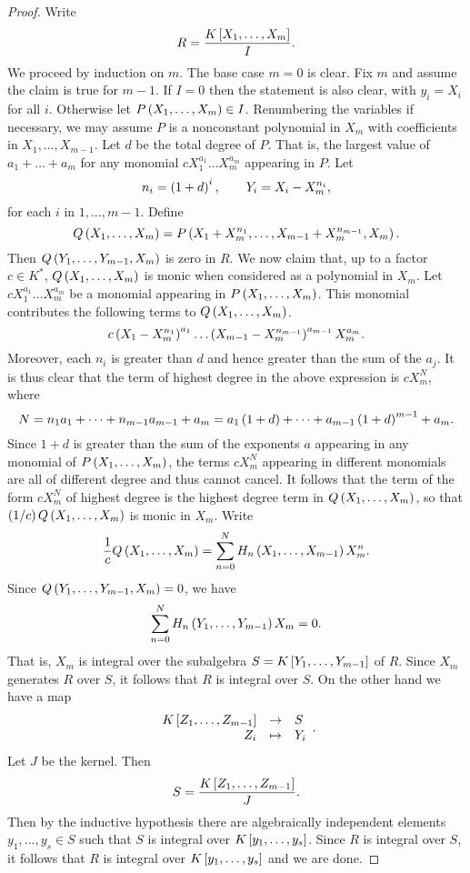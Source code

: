\begin{proof}
Write
$$ R = \dfrac{K\sb{X_1, \dots, X_m}}{I}. $$
We proceed by induction on $ m $. The base case $ m = 0 $ is clear. Fix $ m $ and assume the claim is true for $ m - 1 $. If $ I = 0 $ then the statement is also clear, with $ y_i = X_i $ for all $ i $. Otherwise let $ P\rb{X_1, \dots, X_m} \in I $. Renumbering the variables if necessary, we may assume $ P $ is a nonconstant polynomial in $ X_m $ with coefficients in $ X_1, \dots, X_{m - 1} $. Let $ d $ be the total degree of $ P $. That is, the largest value of $ a_1 + \dots + a_m $ for any monomial $ cX_1^{a_1} \dots X_m^{a_m} $ appearing in $ P $. Let
$$ n_i = \rb{1 + d}^i, \qquad Y_i = X_i - X_m^{n_i}, $$
for each $ i $ in $ 1, \dots, m - 1 $. Define
$$ Q\rb{X_1, \dots, X_m} = P\rb{X_1 + X_m^{n_1}, \dots, X_{m - 1} + X_m^{n_{m - 1}}, X_m}. $$
Then $ Q\rb{Y_1, \dots, Y_{m - 1}, X_m} $ is zero in $ R $. We now claim that, up to a factor $ c \in K^* $, $ Q\rb{X_1, \dots, X_m} $ is monic when considered as a polynomial in $ X_m $. Let $ cX_1^{a_1} \dots X_m^{a_m} $ be a monomial appearing in $ P\rb{X_1, \dots, X_m} $. This monomial contributes the following terms to $ Q\rb{X_1, \dots, X_m} $.
$$ c\rb{X_1 - X_m^{n_1}}^{a_1} \dots \rb{X_{m - 1} - X_m^{n_{m - 1}}}^{a_{m - 1}}X_m^{a_m}. $$
Moreover, each $ n_i $ is greater than $ d $ and hence greater than the sum of the $ a_j $. It is thus clear that the term of highest degree in the above expression is $ cX_m^N $, where
$$ N = n_1a_1 + \dots + n_{m - 1}a_{m - 1} + a_m = a_1\rb{1 + d} + \dots + a_{m - 1}\rb{1 + d}^{m - 1} + a_m. $$
Since $ 1 + d $ is greater than the sum of the exponents $ a $ appearing in any monomial of $ P\rb{X_1, \dots, X_m} $, the terms $ cX_m^N $ appearing in different monomials are all of different degree and thus cannot cancel. It follows that the term of the form $ cX_m^N $ of highest degree is the highest degree term in $ Q\rb{X_1, \dots, X_m} $, so that $ \rb{1 / c}Q\rb{X_1, \dots, X_m} $ is monic in $ X_m $. Write
$$ \dfrac{1}{c}Q\rb{X_1, \dots, X_m} = \sum_{n = 0}^N H_n\rb{X_1, \dots, X_{m - 1}}X_m^n. $$
Since $ Q\rb{Y_1, \dots, Y_{m - 1}, X_m} = 0 $, we have
$$ \sum_{n = 0}^N H_n\rb{Y_1, \dots, Y_{m - 1}}X_m = 0. $$
That is, $ X_m $ is integral over the subalgebra $ S = K\sb{Y_1, \dots, Y_{m - 1}} $ of $ R $. Since $ X_m $ generates $ R $ over $ S $, it follows that $ R $ is integral over $ S $. On the other hand we have a map
$$ \function{K\sb{Z_1, \dots, Z_{m - 1}}}{S}{Z_i}{Y_i}. $$
Let $ J $ be the kernel. Then
$$ S = \dfrac{K\sb{Z_1, \dots, Z_{m - 1}}}{J}. $$
Then by the inductive hypothesis there are algebraically independent elements $ y_1, \dots, y_s \in S $ such that $ S $ is integral over $ K\sb{y_1, \dots, y_s} $. Since $ R $ is integral over $ S $, it follows that $ R $ is integral over $ K\sb{y_1, \dots, y_s} $ and we are done.
\end{proof}

